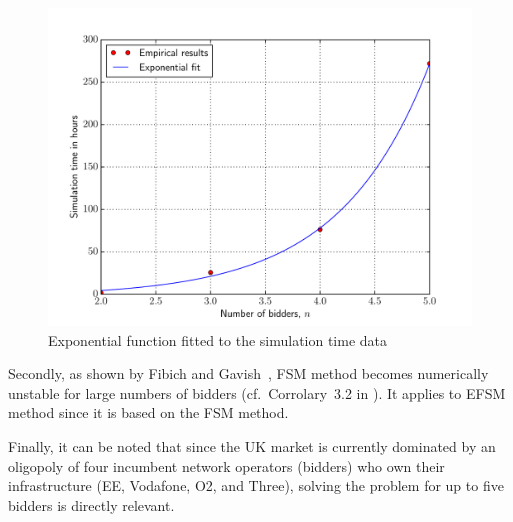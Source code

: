 \begin{figure}[t!]
  \includegraphics[width=\figsize]{Approximation/Figures/simulation_time}
  \caption{Exponential function fitted to the simulation time data}
  \label{fig:simulation_time_approximation}
\end{figure}

Secondly, as shown by Fibich and Gavish~\cite{FibichGavish2011}, FSM method becomes numerically unstable for large numbers of bidders (cf.~Corrolary~3.2 in \cite{FibichGavish2011}). It applies to EFSM method since it is based on the FSM method.

Finally, it can be noted that since the UK market is currently dominated by an oligopoly of four incumbent network operators (bidders) who own their infrastructure (EE, Vodafone, O2, and Three), solving the problem for up to five bidders is directly relevant.

